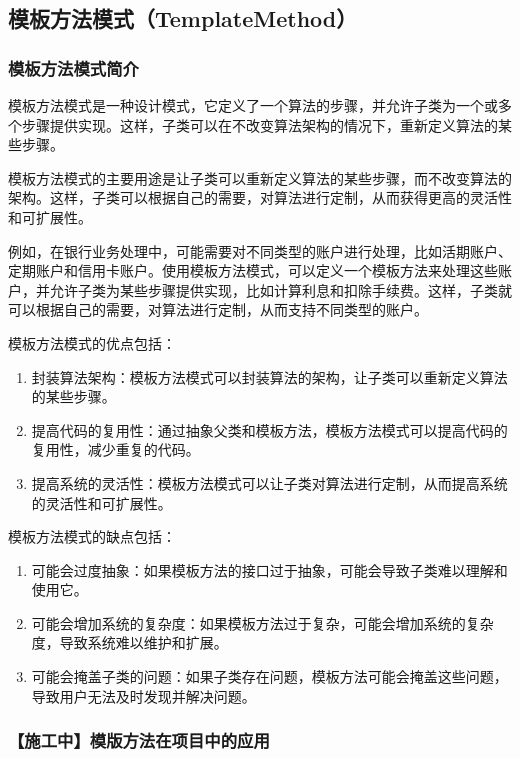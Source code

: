 \subsection{模板方法模式（TemplateMethod）}

\subsubsection{模板方法模式简介}

模板方法模式是一种设计模式，它定义了一个算法的步骤，并允许子类为一个或多个步骤提供实现。这样，子类可以在不改变算法架构的情况下，重新定义算法的某些步骤。

模板方法模式的主要用途是让子类可以重新定义算法的某些步骤，而不改变算法的架构。这样，子类可以根据自己的需要，对算法进行定制，从而获得更高的灵活性和可扩展性。

例如，在银行业务处理中，可能需要对不同类型的账户进行处理，比如活期账户、定期账户和信用卡账户。使用模板方法模式，可以定义一个模板方法来处理这些账户，并允许子类为某些步骤提供实现，比如计算利息和扣除手续费。这样，子类就可以根据自己的需要，对算法进行定制，从而支持不同类型的账户。



模板方法模式的优点包括：
\begin{enumerate}
    \item 封装算法架构：模板方法模式可以封装算法的架构，让子类可以重新定义算法的某些步骤。
    \item 提高代码的复用性：通过抽象父类和模板方法，模板方法模式可以提高代码的复用性，减少重复的代码。
    \item 提高系统的灵活性：模板方法模式可以让子类对算法进行定制，从而提高系统的灵活性和可扩展性。
\end{enumerate}



模板方法模式的缺点包括：
\begin{enumerate}
    \item 可能会过度抽象：如果模板方法的接口过于抽象，可能会导致子类难以理解和使用它。
    \item 可能会增加系统的复杂度：如果模板方法过于复杂，可能会增加系统的复杂度，导致系统难以维护和扩展。
    \item 可能会掩盖子类的问题：如果子类存在问题，模板方法可能会掩盖这些问题，导致用户无法及时发现并解决问题。
\end{enumerate}




\subsubsection{【施工中】模版方法在项目中的应用}